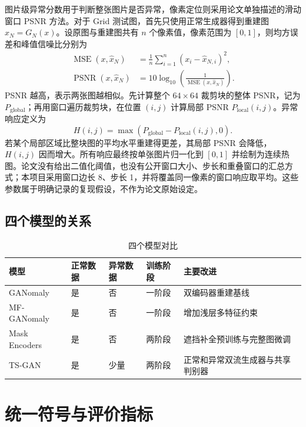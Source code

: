 \documentclass[UTF8,12pt]{ctexart}
\begin{document}
图片级异常分数用于判断整张图片是否异常，像素定位则采用论文单独描述的滑动窗口 PSNR 方法。对于 Grid 测试图，首先只使用正常生成器得到重建图 $\hat{x}_N=G_N(x)$。设原图与重建图共有 $n$ 个像素值，像素范围为 $[0,1]$，则均方误差和峰值信噪比分别为
\begin{align}
\operatorname{MSE}(x,\hat{x}_N)
&=\frac{1}{n}\sum_{i=1}^{n}(x_i-\hat{x}_{N,i})^2,\\
\operatorname{PSNR}(x,\hat{x}_N)
&=10\log_{10}\left(\frac{1}{\operatorname{MSE}(x,\hat{x}_N)}\right).
\end{align}
PSNR 越高，表示两张图越相似。先计算整个 $64\times64$ 裁剪块的整体 PSNR，记为 $P_{\mathrm{global}}$；再用窗口遍历裁剪块，在位置 $(i,j)$ 计算局部 PSNR $P_{\mathrm{local}}(i,j)$。异常响应定义为
\begin{equation}
H(i,j)=\max\left(P_{\mathrm{global}}-P_{\mathrm{local}}(i,j),0\right).
\end{equation}
若某个局部区域比整块图的平均水平重建得更差，其局部 PSNR 会降低，$H(i,j)$ 因而增大。所有响应最终按单张图片归一化到 $[0,1]$ 并绘制为连续热图。论文没有给出二值化阈值，也没有公开窗口大小、步长和重叠窗口的汇总方式；本项目采用窗口边长 8、步长 1，并将覆盖同一像素的窗口响应取平均。这些参数属于明确记录的复现假设，不作为论文原始设定。

\subsection{四个模型的关系}

\begin{table}[H]
\centering
\caption{四个模型对比}
\small
\begin{tabularx}{\linewidth}{L{2.4cm}C{1.5cm}C{1.7cm}C{1.6cm}Y}
\toprule
\textbf{模型} & \textbf{正常数据} & \textbf{异常数据} & \textbf{训练阶段} & \textbf{主要改进} \\
\midrule
GANomaly & 是 & 否 & 一阶段 & 双编码器重建基线 \\
MF-GANomaly & 是 & 否 & 一阶段 & 增加浅层多特征约束 \\
Mask Encoders & 是 & 否 & 两阶段 & 遮挡补全预训练与完整图微调 \\
TS-GAN & 是 & 少量 & 两阶段 & 正常和异常双流生成器与共享判别器 \\
\bottomrule
\end{tabularx}
\end{table}

\section{统一符号与评价指标}
\end{document}
